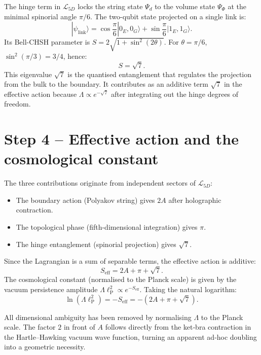 \documentclass[12pt]{article}
\begin{document}
The hinge term in \(\mathcal{L}_{5D}\) locks the string state \(\Psi_d\) to the volume state \(\Psi_\Phi\) at the minimal spinorial angle \(\pi/6\). The two-qubit state projected on a single link is:
\begin{equation}\label{eq:link}
|\psi_{\text{link}}\rangle = \cos\frac{\pi}{6}|0_E,0_G\rangle + \sin\frac{\pi}{6}|1_E,1_G\rangle.
\end{equation}
Its Bell-CHSH parameter is \(S = 2\sqrt{1+\sin^2(2\theta)}\). For \(\theta=\pi/6\), \(\sin^2(\pi/3)=3/4\), hence:
\begin{equation}\label{eq:sqrt7}
S = \sqrt{7}.
\end{equation}
This eigenvalue \(\sqrt{7}\) is the quantised entanglement that regulates the projection from the bulk to the boundary. It contributes as an additive term \(\sqrt{7}\) in the effective action because \(\Lambda \propto e^{-\sqrt{7}}\) after integrating out the hinge degrees of freedom.

\section{Step 4 – Effective action and the cosmological constant}

The three contributions originate from independent sectors of \(\mathcal{L}_{5D}\):
\begin{itemize}
  \item The boundary action (Polyakov string) gives \(2A\) after holographic contraction.
  \item The topological phase (fifth-dimensional integration) gives \(\pi\).
  \item The hinge entanglement (spinorial projection) gives \(\sqrt{7}\).
\end{itemize}
Since the Lagrangian is a sum of separable terms, the effective action is additive:
\begin{equation}\label{eq:Seff}
S_{\text{eff}} = 2A + \pi + \sqrt{7}.
\end{equation}
The cosmological constant (normalised to the Planck scale) is given by the vacuum persistence amplitude \(\Lambda \ell_{\text{P}}^2 \propto e^{-S_{\text{eff}}}\). Taking the natural logarithm:
\begin{equation}\label{eq:LnLambda}
\ln(\Lambda \ell_{\text{P}}^2) = -S_{\text{eff}} = -(2A + \pi + \sqrt{7}).
\end{equation}

All dimensional ambiguity has been removed by normalising \(\Lambda\) to the Planck scale. The factor \(2\) in front of \(A\) follows directly from the ket‑bra contraction in the Hartle–Hawking vacuum wave function, turning an apparent ad‑hoc doubling into a geometric necessity.
\end{document}
